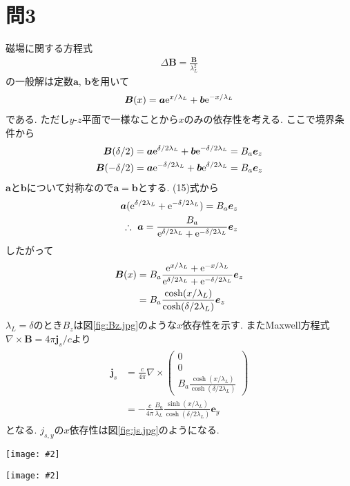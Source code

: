 \documentclass[uplatex,a4j,11pt,dvipdfmx]{jsarticle}
\makeatletter
\def\fgcaption{\def\@captype{figure}\caption}
\newcommand{\mfig}[3][width=15cm]{
\begin{center}
\texttt{[image: \#2]}
\fgcaption{#3 \label{fig:#2}}
\end{center}
}
\makeatother
\begin{document}
\section*{問3}
磁場に関する方程式
\begin{align}
  \Delta {\bm B}=\frac{\bm B}{\lambda_L^2}
\end{align}
の一般解は定数$\bm a$, $\bm b$を用いて
\begin{align}
  {\bm B}(x)={\bm a}{\rm e}^{x/\lambda_L}+{\bm b}{\rm e}^{-x/\lambda_L}
\end{align}
である.
ただし$y$-$z$平面で一様なことから$x$のみの依存性を考える.
ここで境界条件から
\begin{align}
  {\bm B}(\delta/2)&={\bm a}{\rm e}^{\delta/2\lambda_L}+{\bm b}{\rm e}^{-\delta/2\lambda_L}=B_a{\bm e}_z\\
  {\bm B}(-\delta/2)&={\bm a}{\rm e}^{-\delta/2\lambda_L}+{\bm b}{\rm e}^{\delta/2\lambda_L}=B_a{\bm e}_z
\end{align}
${\bm a}$と${\bm b}$について対称なので${\bm a}={\bm b}$とする.
(15)式から
\begin{align}
  \begin{split}
    {\bm a}({\rm e}^{\delta/2\lambda_L}+{\rm e}^{-\delta/2\lambda_L})=B_a{\bm e}_z\\
    \therefore\ {\bm a}=\frac{B_a}{{\rm e}^{\delta/2\lambda_L}+{\rm e}^{-\delta/2\lambda_L}}{\bm e}_z
  \end{split}
\end{align}
したがって
\begin{align}
  \begin{split}
    {\bm B}(x)&=B_a\frac{{\rm e}^{x/\lambda_L}+{\rm e}^{-x/\lambda_L}}{{\rm e}^{\delta/2\lambda_L}+{\rm e}^{-\delta/2\lambda_L}}{\bm e}_z\\
    &=B_a\frac{\cosh(x/\lambda_L)}{\cosh(\delta/2\lambda_L)}{\bm e}_z
  \end{split}
\end{align}
$\lambda_L=\delta$のとき$B_z$は図\ref{fig:Bz.jpg}のような$x$依存性を示す.
またMaxwell方程式$\nabla\times{\bm B}=4\pi{\bm j}_s/c$より
\begin{align}
  \begin{split}
    {\bm j}_s&=\frac{c}{4\pi}\nabla\times\left(\begin{matrix}
      0\\0\\B_a\frac{\cosh(x/\lambda_L)}{\cosh(\delta/2\lambda_L)}
    \end{matrix}\right)\\
    &=-\frac{c}{4\pi}\frac{B_a}{\lambda_L}\frac{\sinh(x/\lambda_L)}{\cosh(\delta/2\lambda_L)}{\bm e}_y
  \end{split}
\end{align}
となる.
$j_{s,y}$の$x$依存性は図\ref{fig:js.jpg}のようになる.
\mfig[width=8cm]{Bz.jpg}{$B_z$の$x$依存性}
\mfig[width=8cm]{js.jpg}{$j_{s,y}$の$x$依存性}
\end{document}
